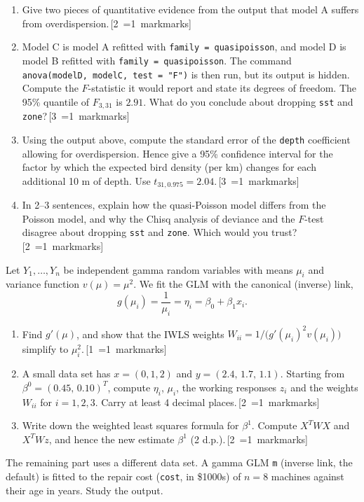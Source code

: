 \documentclass[11pt,a4paper]{article}
\newcommand{\mk}[1]{\hfill\hspace*{\fill}\mbox{\,[#1~\ifnum#1=1 mark\else marks\fi]}}
\newcommand{\ans}[1]{\par\nopagebreak[4]\vspace{2pt}\noindent\fbox{\rule{0pt}{#1}\hspace{\dimexpr\linewidth-2\fboxsep-2\fboxrule\relax}}\par\vspace{4pt}}
\newcommand{\qhead}[2]{\Needspace{10\baselineskip}\vspace{10pt}{\large\bfseries Question #1 (#2 marks)}\par\vspace{2pt}}
\newcommand{\R}[1]{\VerbatimInput[fontsize=\footnotesize,frame=single,framesep=2mm,rulecolor=\color{black!50}]{final/r/out/#1}}
\renewcommand{\R}[1]{\VerbatimInput[fontsize=\scriptsize,frame=single,framesep=1.5mm,rulecolor=\color{black!50}]{r/out/#1}}
\begin{document}
\R{d_q4.txt}

\begin{enumerate}
\item Give two pieces of quantitative evidence from the output that model A suffers from overdispersion.\mk{2}
\ans{3.6cm}
\item Model C is model A refitted with \texttt{family = quasipoisson}, and model D is model B refitted with \texttt{family = quasipoisson}. The command \texttt{anova(modelD, modelC, test = "F")} is then run, but its output is hidden. Compute the $F$-statistic it would report and state its degrees of freedom. The 95\% quantile of $F_{3,31}$ is $2.91$. What do you conclude about dropping \texttt{sst} and \texttt{zone}?\mk{3}
\ans{6cm}
\item Using the output above, compute the standard error of the \texttt{depth} coefficient allowing for overdispersion. Hence give a 95\% confidence interval for the factor by which the expected bird density (per km) changes for each additional 10 m of depth. Use $t_{31,0.975}=2.04$.\mk{3}
\ans{7cm}
\item In 2--3 sentences, explain how the quasi-Poisson model differs from the Poisson model, and why the Chisq analysis of deviance and the $F$-test disagree about dropping \texttt{sst} and \texttt{zone}. Which would you trust?\mk{2}
\ans{4.5cm}
\end{enumerate}

\clearpage
\qhead{5}{7}
Let $Y_1,\dots,Y_n$ be independent gamma random variables with means $\mu_i$ and variance function $v(\mu)=\mu^2$. We fit the GLM with the canonical (inverse) link,
\[ g(\mu_i)=\frac1{\mu_i}=\eta_i=\beta_0+\beta_1x_i. \]
\begin{enumerate}
\item Find $g'(\mu)$, and show that the IWLS weights $W_{ii}=1/\big(g'(\mu_i)^2v(\mu_i)\big)$ simplify to $\mu_i^2$.\mk{1}
\ans{3cm}
\item A small data set has $x=(0,1,2)$ and $y=(2.4,\,1.7,\,1.1)$. Starting from $\beta^{0}=(0.45,\,0.10)^T$, compute $\eta_i$, $\mu_i$, the working responses $z_i$ and the weights $W_{ii}$ for $i=1,2,3$. Carry at least 4 decimal places.\mk{2}
\ans{6cm}
\item Write down the weighted least squares formula for $\beta^1$. Compute $X^TWX$ and $X^TWz$, and hence the new estimate $\beta^1$ (2 d.p.).\mk{2}
\ans{7cm}
\end{enumerate}
The remaining part uses a different data set. A gamma GLM \texttt{m} (inverse link, the default) is fitted to the repair cost (\texttt{cost}, in \$1000s) of $n=8$ machines against their age in years. Study the output.
\end{document}
